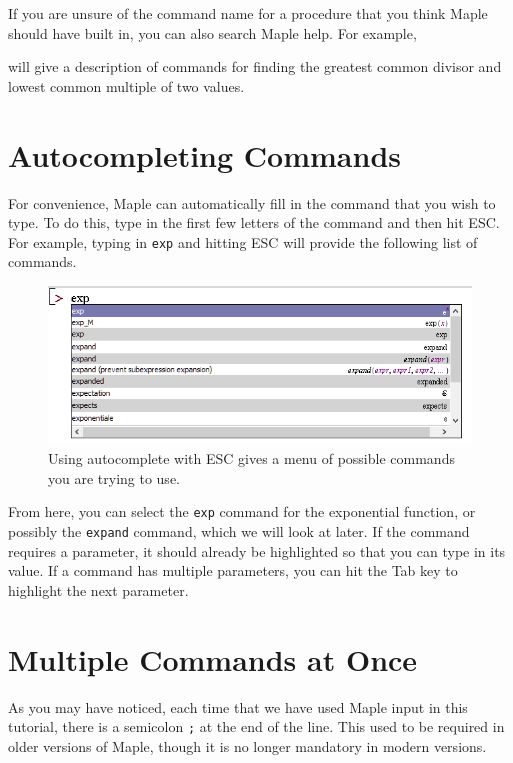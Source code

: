 If you are unsure of the command name for a procedure that you think Maple should have built in, you can also search Maple help. For example,
\begin{mapleinput}  \end{mapleinput}  
\noindent will give a description of commands for finding the greatest common divisor and lowest common multiple of two values.

\section{Autocompleting Commands}
\label{sec:autocompleting_commands}

For convenience, Maple can automatically fill in the command that you wish to type. To do this, type in the first few letters of the command  and then hit ESC. 
For example, typing in \texttt{exp} and hitting ESC will provide the following list of commands.
\begin{figure}
\centering
\includegraphics[width=\textwidth]{tutorials/figures/autocomplete.png}
\caption{Using autocomplete with ESC gives a menu of possible commands you are trying to use.}
\end{figure}
From here, you can select the \texttt{exp} command for the exponential function, or possibly the \texttt{expand} command, which we will look at later. If the command requires a parameter, it should already be highlighted so that you can type in its value. If a command has multiple parameters, you can hit the Tab key to highlight the next parameter.

\section{Multiple Commands at Once}
\label{sec:multiple_commands_at_once}

As you may have noticed, each time that we have used Maple input in this tutorial, there is a semicolon \texttt{;} at the end of the line. This used to be required in older versions of Maple, though it is no longer mandatory in modern versions.

